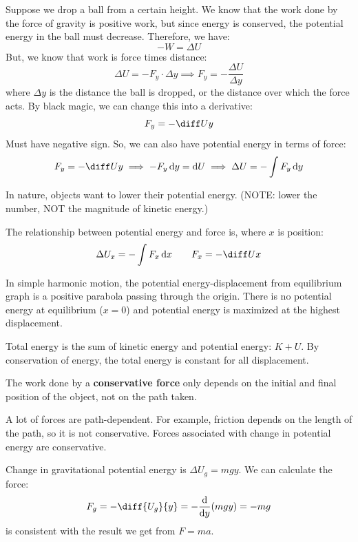 \documentclass{article}
\newcommand{\definition}[1]{\begin{tcolorbox}[colback=red!5!white,colframe=red!75!black,parbox=false] #1 \end{tcolorbox}}
\newcommand{\theorem}[2]{\begin{tcolorbox}[title={#1},colback=blue!5!white,colframe=blue!75!black,parbox=false] #2 \end{tcolorbox}}
\newcommand{\example}[2]{\begin{tcolorbox}[title={Example: #1},colback=brown!5!white,colframe=brown!75!black,parbox=false] #2 \end{tcolorbox}}
\newcommand{\remark}[2]{\begin{tcolorbox}[title={#1},colback=black!5!white,colframe=black!75!black,parbox=false] #2 \end{tcolorbox}}
\newcommand*{\deriv}[1][x]{\ensuremath{\dfrac{\mathrm{d}}{\mathrm{d}#1}}}
\begin{document}
Suppose we drop a ball from a certain height. We know that the work done by the force of gravity is positive work, but since energy is conserved, the potential energy in the ball must decrease. Therefore, we have:
\begin{equation*}
    -W=\Delta U 
\end{equation*}
But, we know that work is force times distance:
\begin{equation*}
	\Delta U=-F_y\cdot \Delta y
	\implies F_y=-\frac{\Delta U}{\Delta y}
\end{equation*}
where $\Delta y$ is the distance the ball is dropped, or the distance over which the force acts. By black magic, we can change this into a derivative:
\begin{equation*}
	F_y=-\diff Uy
\end{equation*}
Must have negative sign. So, we can also have potential energy in terms of force:
\begin{equation*}
    F_y=-\diff Uy
	\implies -F_y \,\mathrm{d}y=\mathrm{d}U
	\implies \Delta U=-\int F_y\,\mathrm{d}y
\end{equation*}
\remark*{In nature, objects want to lower their potential energy. (NOTE: lower the number, NOT the magnitude of kinetic energy.)}

\theorem{Potential energy}{
	The relationship between potential energy and force is, where $x$ is position:
	\begin{equation*}
	    \Delta U_x=-\int F_x\,\mathrm{d}x
		\qquad
		F_x=-\diff Ux
	\end{equation*}
}

In simple harmonic motion, the potential energy-displacement from equilibrium graph is a positive parabola passing through the origin. There is no potential energy at equilibrium ($x=0$) and potential energy is maximized at the highest displacement.

Total energy is the sum of kinetic energy and potential energy: $K+U$. By conservation of energy, the total energy is constant for all displacement.

\definition{The work done by a \textbf{conservative force} only depends on the initial and final position of the object, not on the path taken.}

A lot of forces are path-dependent. For example, friction depends on the length of the path, so it is not conservative. Forces associated with change in potential energy are conservative.

\example{Gravitional potential}{
	Change in gravitational potential energy is $\Delta U_g=mgy$. We can calculate the force:
	\begin{equation*}
		F_g=-\diff{U_g}{y}=-\deriv[y](mgy)=-mg
	\end{equation*}
	is consistent with the result we get from $F=ma$.
}
\end{document}
